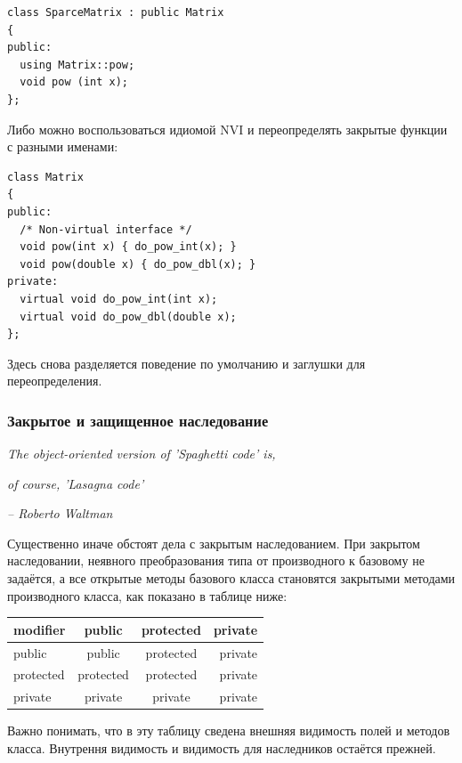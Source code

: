 \documentclass[a4paper,12pt,oneside]{article}
\begin{document}
\begin{lstlisting}
class SparceMatrix : public Matrix
{
public:
  using Matrix::pow;
  void pow (int x);
};
\end{lstlisting}

Либо можно воспользоваться идиомой NVI и переопределять закрытые функции с разными именами:

\begin{lstlisting}
class Matrix
{
public:
  /* Non-virtual interface */
  void pow(int x) { do_pow_int(x); }
  void pow(double x) { do_pow_dbl(x); }
private:
  virtual void do_pow_int(int x);
  virtual void do_pow_dbl(double x);
};
\end{lstlisting}

Здесь снова разделяется поведение по умолчанию и заглушки для переопределения.

\subsubsection{Закрытое и защищенное наследование}\label{OtherInheritance}

\hfill\textit{The object-oriented version of 'Spaghetti code' is,}

\hfill\textit{of course, 'Lasagna code'}{\vspace{0.5em}}

\hfill\textit{-- Roberto Waltman}

Существенно иначе обстоят дела с закрытым наследованием. При закрытом наследовании, неявного преобразования типа от производного к базовому не задаётся, а все открытые методы базового класса становятся закрытыми методами производного класса, как показано в таблице ниже:

\begin{center}
  \begin{tabular}{ | l | c | c | r | }
    \hline
    modifier & public & protected & private \\ \hline \hline
    public & public & protected & private \\ \hline
    protected & protected & protected & private \\ \hline
    private & private & private & private \\ \hline
  \end{tabular}
\end{center}

Важно понимать, что в эту таблицу сведена внешняя видимость полей и методов класса. Внутрення видимость и видимость для наследников остаётся прежней.
\end{document}
